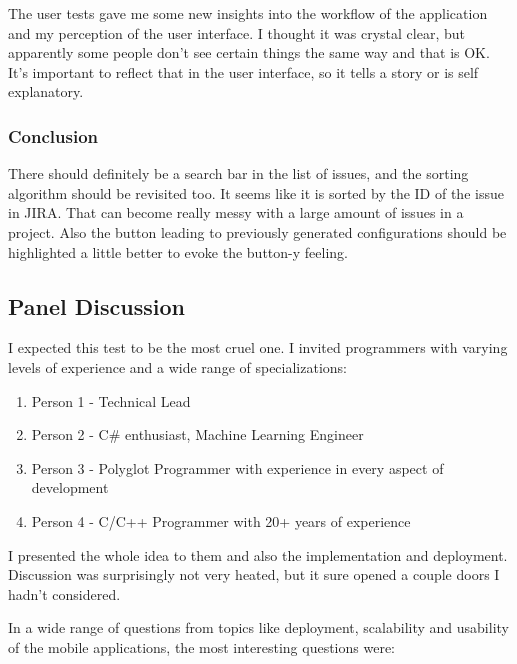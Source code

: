 The user tests gave me some new insights into the workflow of the application and my perception of the user interface. I thought it was crystal clear, but apparently some people don't see certain things the same way and that is OK. It's important to reflect that in the user interface, so it tells a story or is self explanatory.

\subsubsection*{Conclusion}

There should definitely be a search bar in the list of issues, and the sorting algorithm should be revisited too. It seems like it is sorted by the ID of the issue in JIRA. That can become really messy with a large amount of issues in a project. Also the button leading to previously generated configurations should be highlighted a little better to evoke the button-y feeling.

\subsection{Panel Discussion}

I expected this test to be the most cruel one. I invited programmers with varying levels of experience and a wide range of specializations:

\begin{enumerate}
	\item Person 1 - Technical Lead
	\item Person 2 - C\# enthusiast, Machine Learning Engineer
	\item Person 3 - Polyglot Programmer with experience in every aspect of development
	\item Person 4 - C/C++ Programmer with 20+ years of experience
\end{enumerate}

I presented the whole idea to them and also the implementation and deployment. Discussion was surprisingly not very heated, but it sure opened a couple doors I hadn't considered. 

\newpage

In a wide range of questions from topics like deployment, scalability and usability of the mobile applications, the most interesting questions were:

